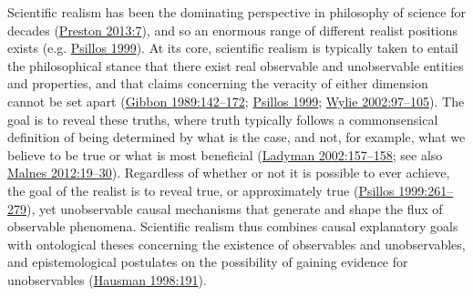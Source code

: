\documentclass[
  12pt,
  a4paper,
  oneside]{book}
\begin{document}
Scientific realism has been the dominating perspective in philosophy of science for decades (\protect\hyperlink{ref-preston2013}{Preston 2013:7}), and so an enormous range of different realist positions exists (e.g. \protect\hyperlink{ref-psillos1999}{Psillos 1999}). At its core, scientific realism is typically taken to entail the philosophical stance that there exist real observable and unobservable entities and properties, and that claims concerning the veracity of either dimension cannot be set apart (\protect\hyperlink{ref-gibbon1989}{Gibbon 1989:142--172}; \protect\hyperlink{ref-psillos1999}{Psillos 1999}; \protect\hyperlink{ref-wylie2002}{Wylie 2002:97--105}). The goal is to reveal these truths, where truth typically follows a commonsensical definition of being determined by what is the case, and not, for example, what we believe to be true or what is most beneficial (\protect\hyperlink{ref-ladyman2002}{Ladyman 2002:157--158}; see also \protect\hyperlink{ref-malnes2012}{Malnes 2012:19--30}). Regardless of whether or not it is possible to ever achieve, the goal of the realist is to reveal true, or approximately true (\protect\hyperlink{ref-psillos1999}{Psillos 1999:261--279}), yet unobservable causal mechanisms that generate and shape the flux of observable phenomena. Scientific realism thus combines causal explanatory goals with ontological theses concerning the existence of observables and unobservables, and epistemological postulates on the possibility of gaining evidence for unobservables (\protect\hyperlink{ref-hausman1998}{Hausman 1998:191}).
\end{document}
